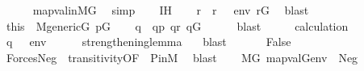 \begin{isabellebody}
\ \ \ \ \isamarkupfalse%
\ map{\isacharunderscore}{\kern0pt}val{\isacharunderscore}{\kern0pt}in{\isacharunderscore}{\kern0pt}MG\ \isamarkupfalse%
\ simp\isanewline
\ \ \isamarkupfalse%
\ IH\isanewline
\ \ \isamarkupfalse%
\ r\ \ {\isachardoublequoteopen}r\ {\isasymtturnstile}\ {\isasymphi}\ env{\isachardoublequoteclose}\ {\isachardoublequoteopen}r{\isasymin}G{\isachardoublequoteclose}\ \isamarkupfalse%
\ blast\isanewline
\ \ \isamarkupfalse%
\ \isamarkupfalse%
\ this\ \ {\isacartoucheopen}M{\isacharunderscore}{\kern0pt}generic{\isacharparenleft}{\kern0pt}G{\isacharparenright}{\kern0pt}{\isacartoucheclose}\ {\isacartoucheopen}p{\isasymin}G{\isacartoucheclose}\isanewline
\ \ \isamarkupfalse%
\ q\ \ {\isachardoublequoteopen}q{\isasympreceq}p{\isachardoublequoteclose}\ {\isachardoublequoteopen}q{\isasympreceq}r{\isachardoublequoteclose}\ {\isachardoublequoteopen}q{\isasymin}G{\isachardoublequoteclose}\isanewline
\ \ \ \ \isamarkupfalse%
\ blast\isanewline
\ \ \isamarkupfalse%
\ \isamarkupfalse%
\ calculation\ \isanewline
\ \ \isamarkupfalse%
\ {\isachardoublequoteopen}q\ {\isasymtturnstile}\ {\isasymphi}\ env{\isachardoublequoteclose}\isanewline
\ \ \ \ \isamarkupfalse%
\ strengthening{\isacharunderscore}{\kern0pt}lemma{\isacharbrackleft}{\kern0pt}\ {\isasymphi}{\isacharequal}{\kern0pt}{\isasymphi}{\isacharbrackright}{\kern0pt}\ \isamarkupfalse%
\ blast\isanewline
\ \ \isamarkupfalse%
\isanewline
\ \ \isamarkupfalse%
\ {\isachardoublequoteopen}False{\isachardoublequoteclose}\isanewline
\ \ \ \ \isamarkupfalse%
\ Forces{\isacharunderscore}{\kern0pt}Neg{\isacharbrackleft}{\kern0pt}\ {\isasymphi}{\isacharequal}{\kern0pt}{\isasymphi}{\isacharbrackright}{\kern0pt}\ transitivity{\isacharbrackleft}{\kern0pt}OF\ {\isacharunderscore}{\kern0pt}\ P{\isacharunderscore}{\kern0pt}in{\isacharunderscore}{\kern0pt}M{\isacharbrackright}{\kern0pt}\ \isamarkupfalse%
\ blast\isanewline
{}\isamarkupfalse%
\isanewline
\ \ \isamarkupfalse%
\ {\isachardoublequoteopen}M{\isacharbrackleft}{\kern0pt}G{\isacharbrackright}{\kern0pt}{\isacharcomma}{\kern0pt}\ map{\isacharparenleft}{\kern0pt}val{\isacharparenleft}{\kern0pt}G{\isacharparenright}{\kern0pt}{\isacharcomma}{\kern0pt}env{\isacharparenright}{\kern0pt}\ {\isasymTurnstile}\ Neg{\isacharparenleft}{\kern0pt}{\isasymphi}{\isacharparenright}{\kern0pt}{\isachardoublequoteclose}\isanewline

\end{isabellebody}
